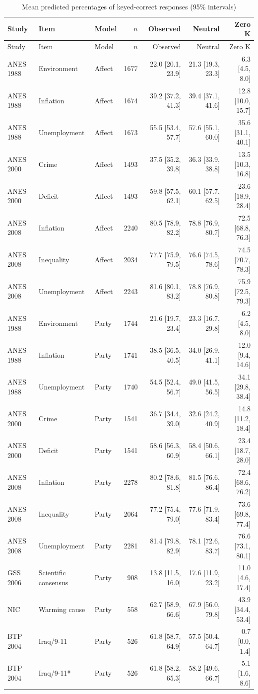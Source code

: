 \begin{longtable}{lllrrrr}
\caption{Mean predicted percentages of keyed-correct responses (95\% intervals)}\label{tab:historicalpredictions}\\
\toprule
Study & Item & Model & $n$ & Observed & Neutral & Zero K \\
\midrule
\endfirsthead
\toprule
Study & Item & Model & $n$ & Observed & Neutral & Zero K \\
\midrule
\endhead
\bottomrule
\endlastfoot
ANES 1988 & Environment & Affect & 1677 & 22.0 [20.1, 23.9] & 21.3 [19.3, 23.3] & 6.3 [4.5, 8.0] \\
ANES 1988 & Inflation & Affect & 1674 & 39.2 [37.2, 41.3] & 39.4 [37.1, 41.6] & 12.8 [10.0, 15.7] \\
ANES 1988 & Unemployment & Affect & 1673 & 55.5 [53.4, 57.7] & 57.6 [55.1, 60.0] & 35.6 [31.1, 40.1] \\
ANES 2000 & Crime & Affect & 1493 & 37.5 [35.2, 39.8] & 36.3 [33.9, 38.8] & 13.5 [10.3, 16.8] \\
ANES 2000 & Deficit & Affect & 1493 & 59.8 [57.5, 62.1] & 60.1 [57.7, 62.5] & 23.6 [18.9, 28.4] \\
ANES 2008 & Inflation & Affect & 2240 & 80.5 [78.9, 82.2] & 78.8 [76.9, 80.7] & 72.5 [68.8, 76.3] \\
ANES 2008 & Inequality & Affect & 2034 & 77.7 [75.9, 79.5] & 76.6 [74.5, 78.6] & 74.5 [70.7, 78.3] \\
ANES 2008 & Unemployment & Affect & 2243 & 81.6 [80.1, 83.2] & 78.8 [76.9, 80.8] & 75.9 [72.5, 79.3] \\
ANES 1988 & Environment & Party & 1744 & 21.6 [19.7, 23.4] & 23.3 [16.7, 29.8] & 6.2 [4.5, 8.0] \\
ANES 1988 & Inflation & Party & 1741 & 38.5 [36.5, 40.5] & 34.0 [26.9, 41.1] & 12.0 [9.4, 14.6] \\
ANES 1988 & Unemployment & Party & 1740 & 54.5 [52.4, 56.7] & 49.0 [41.5, 56.5] & 34.1 [29.8, 38.4] \\
ANES 2000 & Crime & Party & 1541 & 36.7 [34.4, 39.0] & 32.6 [24.2, 40.9] & 14.8 [11.2, 18.4] \\
ANES 2000 & Deficit & Party & 1541 & 58.6 [56.3, 60.9] & 58.4 [50.6, 66.1] & 23.4 [18.7, 28.0] \\
ANES 2008 & Inflation & Party & 2278 & 80.2 [78.6, 81.8] & 81.5 [76.6, 86.4] & 72.4 [68.6, 76.2] \\
ANES 2008 & Inequality & Party & 2064 & 77.2 [75.4, 79.0] & 77.6 [71.9, 83.4] & 73.6 [69.8, 77.4] \\
ANES 2008 & Unemployment & Party & 2281 & 81.4 [79.8, 82.9] & 78.1 [72.6, 83.7] & 76.6 [73.1, 80.1] \\
GSS 2006 & Scientific consensus & Party &  908 & 13.8 [11.5, 16.0] & 17.6 [11.9, 23.2] & 11.0 [4.6, 17.4] \\
NIC & Warming cause & Party &  558 & 62.7 [58.9, 66.6] & 67.9 [56.0, 79.8] & 43.9 [34.4, 53.4] \\
BTP 2004 & Iraq/9-11 & Party &  526 & 61.8 [58.7, 64.9] & 57.5 [50.4, 64.7] & 0.7 [0.0, 1.4] \\
BTP 2004 & Iraq/9-11* & Party &  526 & 61.8 [58.2, 65.3] & 58.2 [49.6, 66.7] & 5.1 [1.6, 8.6] \\
\end{longtable}
